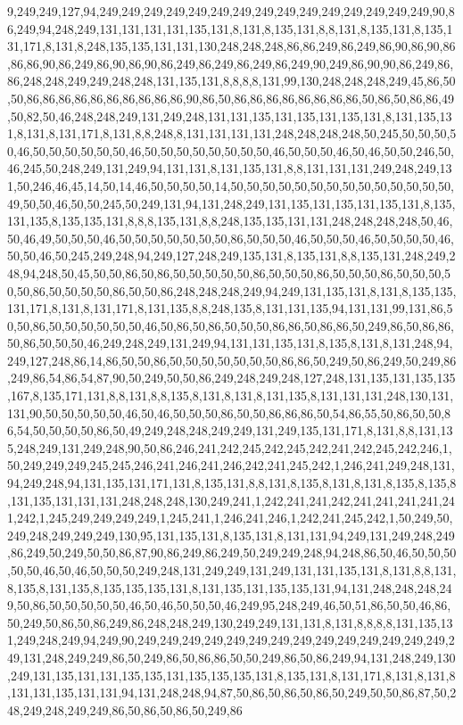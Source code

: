 9,249,249,127,94,249,249,249,249,249,249,249,249,249,249,249,249,249,249,249,90,86,249,94,248,249,131,131,131,131,135,131,8,131,8,135,131,8,8,131,8,135,131,8,135,131,171,8,131,8,248,135,135,131,131,130,248,248,248,86,86,249,86,249,86,90,86,90,86,86,86,90,86,249,86,90,86,90,86,249,86,249,86,249,86,249,90,249,86,90,90,86,249,86,86,248,248,249,249,248,248,131,135,131,8,8,8,8,131,99,130,248,248,248,249,45,86,50,50,86,86,86,86,86,86,86,86,86,86,90,86,50,86,86,86,86,86,86,86,86,50,86,50,86,86,49,50,82,50,46,248,248,249,131,249,248,131,131,135,131,135,131,135,131,8,131,135,131,8,131,8,131,171,8,131,8,8,248,8,131,131,131,131,248,248,248,248,50,245,50,50,50,50,46,50,50,50,50,50,50,46,50,50,50,50,50,50,50,50,46,50,50,50,46,50,46,50,50,246,50,46,245,50,248,249,131,249,94,131,131,8,131,135,131,8,8,131,131,131,249,248,249,131,50,246,46,45,14,50,14,46,50,50,50,50,14,50,50,50,50,50,50,50,50,50,50,50,50,50,50,49,50,50,46,50,50,245,50,249,131,94,131,248,249,131,135,131,135,131,135,131,8,135,131,135,8,135,135,131,8,8,8,135,131,8,8,248,135,135,131,131,248,248,248,248,50,46,50,46,49,50,50,50,46,50,50,50,50,50,50,50,86,50,50,50,46,50,50,50,46,50,50,50,50,46,50,50,46,50,245,249,248,94,249,127,248,249,135,131,8,135,131,8,8,135,131,248,249,248,94,248,50,45,50,50,86,50,86,50,50,50,50,50,86,50,50,50,86,50,50,50,86,50,50,50,50,50,86,50,50,50,50,86,50,50,86,248,248,248,249,94,249,131,135,131,8,131,8,135,135,131,171,8,131,8,131,171,8,131,135,8,8,248,135,8,131,131,135,94,131,131,99,131,86,50,50,86,50,50,50,50,50,50,46,50,86,50,86,50,50,50,86,86,50,86,86,50,249,86,50,86,86,50,86,50,50,50,46,249,248,249,131,249,94,131,131,135,131,8,135,8,131,8,131,248,94,249,127,248,86,14,86,50,50,86,50,50,50,50,50,50,50,86,86,50,249,50,86,249,50,249,86,249,86,54,86,54,87,90,50,249,50,50,86,249,248,249,248,127,248,131,135,131,135,135,167,8,135,171,131,8,8,131,8,8,135,8,131,8,131,8,131,135,8,131,131,131,248,130,131,131,90,50,50,50,50,50,46,50,46,50,50,50,86,50,50,86,86,86,50,54,86,55,50,86,50,50,86,54,50,50,50,50,86,50,49,249,248,248,249,249,131,249,135,131,171,8,131,8,8,131,135,248,249,131,249,248,90,50,86,246,241,242,245,242,245,242,241,242,245,242,246,1,50,249,249,249,245,245,246,241,246,241,246,242,241,245,242,1,246,241,249,248,131,94,249,248,94,131,135,131,171,131,8,135,131,8,8,131,8,135,8,131,8,131,8,135,8,135,8,131,135,131,131,131,248,248,248,130,249,241,1,242,241,241,242,241,241,241,241,241,242,1,245,249,249,249,249,1,245,241,1,246,241,246,1,242,241,245,242,1,50,249,50,249,248,249,249,249,130,95,131,135,131,8,135,131,8,131,131,94,249,131,249,248,249,86,249,50,249,50,50,86,87,90,86,249,86,249,50,249,249,248,94,248,86,50,46,50,50,50,50,50,46,50,46,50,50,50,249,248,131,249,249,131,249,131,131,135,131,8,131,8,8,131,8,135,8,131,135,8,135,135,135,131,8,131,135,131,135,135,131,94,131,248,248,248,249,50,86,50,50,50,50,50,46,50,46,50,50,50,46,249,95,248,249,46,50,51,86,50,50,46,86,50,249,50,86,50,86,249,86,248,248,249,130,249,249,131,131,8,131,8,8,8,8,131,135,131,249,248,249,94,249,90,249,249,249,249,249,249,249,249,249,249,249,249,249,249,249,131,248,249,249,86,50,249,86,50,86,86,50,50,249,86,50,86,249,94,131,248,249,130,249,131,135,131,131,135,135,131,135,135,135,131,8,135,131,8,131,171,8,131,8,131,8,131,131,135,131,131,94,131,248,248,94,87,50,86,50,86,50,86,50,249,50,50,86,87,50,248,249,248,249,249,86,50,86,50,86,50,249,86